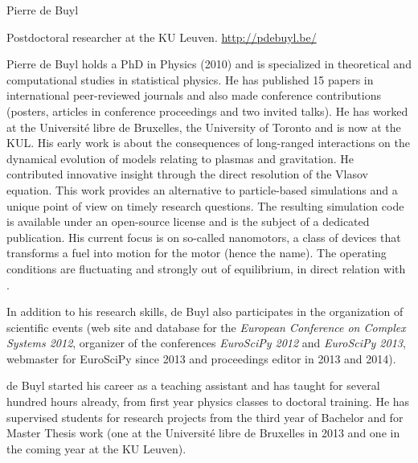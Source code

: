 \begin{participant}[type=R,PM=12,gender=male,salary=5500]{Pierre de Buyl}

Postdoctoral researcher at the KU Leuven. \url{http://pdebuyl.be/}

Pierre de Buyl holds a PhD in Physics (2010) and is specialized in theoretical and
computational studies in statistical physics. He has published 15 papers in international
peer-reviewed journals and also made conference contributions (posters, articles in
conference proceedings and two invited talks). He has worked at the Université libre de
Bruxelles, the University of Toronto and is now at the KUL.
%
His early work is about the consequences of long-ranged interactions on the dynamical
evolution of models relating to plasmas and gravitation.
%
He contributed innovative insight through the direct resolution of the Vlasov equation.
This work provides an alternative to particle-based simulations and a unique point of view
on timely research questions. The resulting simulation code is available under an
open-source license and is the subject of a dedicated publication.
%
His current focus is on so-called nanomotors, a class of devices that transforms a fuel into
motion for the motor (hence the name). The operating conditions are fluctuating and strongly
out of equilibrium, in direct relation with \TheProject.

In addition to his research skills, de Buyl also participates in the organization of
scientific events (web site and database for the {\em European Conference on Complex Systems
  2012}, organizer of the conferences {\em EuroSciPy 2012} and {\em EuroSciPy 2013},
webmaster for EuroSciPy since 2013 and proceedings editor in 2013 and 2014).

de Buyl started his career as a teaching assistant and has taught for several hundred hours
already, from first year physics classes to doctoral training. He has supervised students
for research projects from the third year of Bachelor and for Master Thesis work (one at the
Université libre de Bruxelles in 2013 and one in the coming year at the KU Leuven).

\end{participant}
